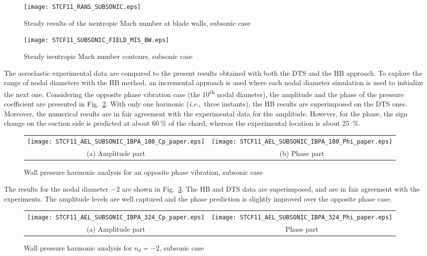 \begin{figure}[htb]
  \centering
  \begin{minipage}[b]{.46\linewidth}
    \centering
    \texttt{[image: STCF11\_RANS\_SUBSONIC.eps]}
    \caption{Steady results of the isentropic Mach number at blade
      walls, subsonic case}
    \label{fig:stcf11_rans_subsonic}
  \end{minipage}\quad
  \begin{minipage}[b]{.46\linewidth}
    \centering
    \texttt{[image: STCF11\_SUBSONIC\_FIELD\_MIS\_BW.eps]}
    \caption{Steady isentropic Mach number contours, subsonic case}
    \label{fig:stcf11_subsonic_field_mis_bw}
  \end{minipage}
\end{figure}

The aeroelastic experimental data are compared to the present results
obtained with both the DTS and the HB approach. To explore the range
of nodal diameters with the HB method, an incremental approach is used
where each nodal diameter simulation is used to initialize the next
one.  Considering the opposite phase vibration case (the 10\textsuperscript{th} nodal diameter), 
the amplitude and the phase of the pressure coefficient are
presented in Fig.~\ref{fig:stcf11_ael_subsonic_ibpa_180_paper}.
With only one harmonic (\emph{i.e.},~three instants), the HB results
are superimposed on the DTS ones. Moreover, the numerical results are
in fair agreement with the experimental data for the
amplitude. However, for the phase, the sign change on the
suction side is predicted at about $60~\%$ of the chord, whereas the
experimental location is about 25~\%.
\begin{figure}[htb]
  \centering 
  \begin{tabular}{cc}
    \texttt{[image: STCF11\_AEL\_SUBSONIC\_IBPA\_180\_Cp\_paper.eps]}
    &
    \texttt{[image: STCF11\_AEL\_SUBSONIC\_IBPA\_180\_Phi\_paper.eps]}\\
    (a) Amplitude part & (b) Phase part
  \end{tabular}
  \caption{Wall pressure harmonic analysis for an opposite phase vibration, subsonic case}
  \label{fig:stcf11_ael_subsonic_ibpa_180_paper}
\end{figure}


The results for the  nodal  diameter $-2$ are shown
in Fig.~\ref{fig:stcf11_ael_subsonic_ibpa_324_paper}. The HB and DTS data
are superimposed, and are in fair agreement with the experiments. The
amplitude levels are well captured and the phase prediction is
slightly improved over the opposite phase case.
\begin{figure}[htb]
  \centering 
  \begin{tabular}{cc}
    \texttt{[image: STCF11\_AEL\_SUBSONIC\_IBPA\_324\_Cp\_paper.eps]}
    &
    \texttt{[image: STCF11\_AEL\_SUBSONIC\_IBPA\_324\_Phi\_paper.eps]}\\
    (a) Amplitude part & Phase part
  \end{tabular}
  \caption{Wall pressure harmonic analysis for \mbox{$n_d=-2$}, subsonic case}
  \label{fig:stcf11_ael_subsonic_ibpa_324_paper}
\end{figure}

